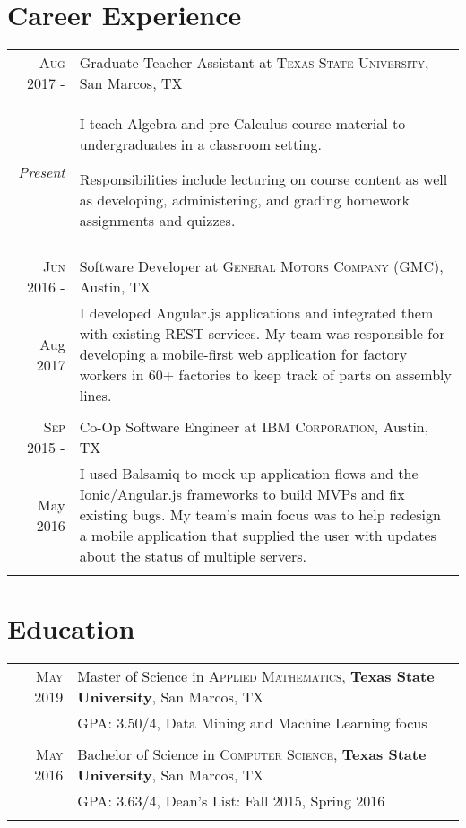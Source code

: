 \documentclass[a4paper,10pt]{article}
\begin{document}
\section{Career Experience}
\begin{tabular}{r|p{12cm}}
\textsc{Aug 2017 -} & Graduate Teacher Assistant at \textsc{Texas State University}, San Marcos, TX \\
\emph{Present} & \footnotesize{I teach Algebra and pre-Calculus course material to undergraduates in a classroom setting.
 
 	Responsibilities include lecturing on course content as well as developing, administering, and grading homework assignments and quizzes.} \\
 \multicolumn{2}{c}{} \\
 
 \textsc{Jun 2016 -} & Software Developer at \textsc{General Motors Company (GMC)}, Austin, TX \\
Aug 2017 & \footnotesize{I developed Angular.js applications and integrated them with existing REST services. My team was responsible for developing a mobile-first web application for factory workers in 60+ factories to keep track of parts on assembly lines.
} \\
 \multicolumn{2}{c}{} \\
 
 \textsc{Sep 2015 -} & Co-Op Software Engineer at \textsc{IBM Corporation}, Austin, TX \\
 May 2016 & \footnotesize{I used Balsamiq to mock up application flows and the Ionic/Angular.js frameworks to build MVPs and fix existing bugs. My team's main focus was to help redesign a mobile application that supplied the user with updates about the status of multiple servers.} \\
 \multicolumn{2}{c}{} \\
\end{tabular}

\section{Education}
\begin{tabular}{rl}	
 \textsc{May} 2019 & Master of Science in \textsc{Applied Mathematics}, \textbf{Texas State University}, San Marcos, TX\\
 
&\normalsize \textsc{GPA}: 3.50/4, Data Mining and Machine Learning focus \\ & \\

\textsc{May} 2016 & Bachelor of Science in \textsc{Computer Science}, \textbf{Texas State University}, San Marcos, TX \\

&\normalsize \textsc{GPA}: 3.63/4, Dean’s List: Fall 2015, Spring 2016 \\&\\
\end{tabular}
\end{document}
